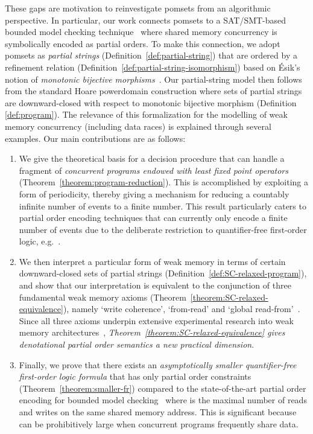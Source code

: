 \documentclass{llncs}
\begin{document}
These gaps are motivation to reinvestigate pomsets from an algorithmic perspective. In particular, our work connects pomsets to a SAT/SMT-based bounded model checking technique~\cite{AKT2013} where shared memory concurrency is symbolically encoded as partial orders. To make this connection, we adopt pomsets as \emph{partial strings} (Definition~\ref{def:partial-string}) that are ordered by a refinement relation (Definition~\ref{def:partial-string-isomorphism}) based on \'{E}sik's notion of \emph{monotonic bijective morphisms}~\cite{E2002}. Our partial-string model then follows from the standard Hoare powerdomain construction where sets of partial strings are downward-closed with respect to monotonic bijective morphism (Definition \ref{def:program}). The relevance of this formalization for the modelling of weak memory concurrency (including data races) is explained through several examples. Our main contributions are as follows:
\begin{enumerate}
\item We give the theoretical basis for a decision procedure that can handle a fragment of \emph{concurrent programs endowed with least fixed point operators} (Theorem~\ref{theorem:program-reduction}). This is accomplished by exploiting a form of periodicity, thereby giving a mechanism for reducing a countably infinite number of events to a finite number. This result particularly caters to partial order encoding techniques that can currently only encode a finite number of events due to the deliberate restriction to quantifier-free first-order logic, e.g.~\cite{AKT2013}.
\item We then interpret a particular form of weak memory in terms of certain downward-closed sets of partial strings (Definition~\ref{def:SC-relaxed-program}), and show that our interpretation is equivalent to the conjunction of three fundamental weak memory axioms (Theorem~\ref{theorem:SC-relaxed-equivalence}), namely `write coherence', `from-read' and `global read-from'~\cite{AMSS2012}. Since all three axioms underpin extensive experimental research into weak memory architectures~\cite{AMSS2011}, \emph{Theorem~\ref{theorem:SC-relaxed-equivalence} gives denotational partial order semantics a new practical dimension}.
\item Finally, we prove that there exists an \emph{asymptotically smaller quantifier-free first-order logic formula} that has only  partial order constraints (Theorem~\ref{theorem:smaller-fr}) compared to the state-of-the-art  partial order encoding for bounded model checking~\cite{AKT2013} where  is the maximal number of reads and writes on the same shared memory address. This is significant because  can be prohibitively large when concurrent programs frequently share data.
\end{enumerate}
\end{document}
